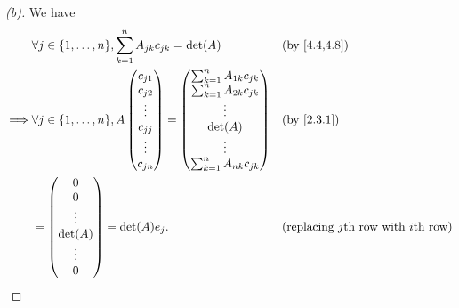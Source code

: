 \begin{proof}[(b)]
  We have
  \begin{align*}
             & \forall j \in \set{1, \dots, n}, \sum_{k = 1}^n A_{j k} c_{j k} = \det(A) &  & \by{4.4,4.8}                                      \\
    \implies & \forall j \in \set{1, \dots, n}, A \begin{pmatrix}
                                                    c_{j 1} \\
                                                    c_{j 2} \\
                                                    \vdots  \\
                                                    c_{j j} \\
                                                    \vdots  \\
                                                    c_{j n}
                                                  \end{pmatrix} = \begin{pmatrix}
                                                                    \sum_{k = 1}^n A_{1 k} c_{j k} \\
                                                                    \sum_{k = 1}^n A_{2 k} c_{j k} \\
                                                                    \vdots                         \\
                                                                    \det(A)                        \\
                                                                    \vdots                         \\
                                                                    \sum_{k = 1}^n A_{n k} c_{j k}
                                                                  \end{pmatrix}                        &  & \by{2.3.1}                          \\
             & = \begin{pmatrix}
                   0       \\
                   0       \\
                   \vdots  \\
                   \det(A) \\
                   \vdots  \\
                   0
                 \end{pmatrix} = \det(A) e_j.                                              &  & \text{(replacing \(j\)th row with \(i\)th row)}
  \end{align*}
\end{proof}


